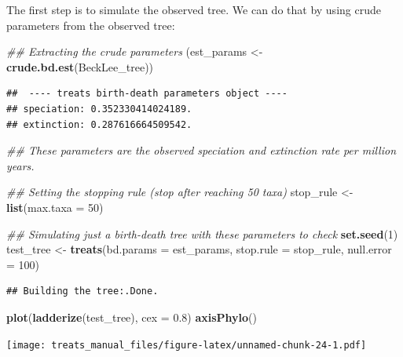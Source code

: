 \documentclass[
]{book}
\newenvironment{Shaded}{\begin{snugshade}}{\end{snugshade}}
\newcommand{\CommentTok}[1]{\textcolor[rgb]{0.56,0.35,0.01}{\textit{#1}}}
\newcommand{\DataTypeTok}[1]{\textcolor[rgb]{0.13,0.29,0.53}{#1}}
\newcommand{\DecValTok}[1]{\textcolor[rgb]{0.00,0.00,0.81}{#1}}
\newcommand{\FloatTok}[1]{\textcolor[rgb]{0.00,0.00,0.81}{#1}}
\newcommand{\KeywordTok}[1]{\textcolor[rgb]{0.13,0.29,0.53}{\textbf{#1}}}
\newcommand{\NormalTok}[1]{#1}
\newcommand{\StringTok}[1]{\textcolor[rgb]{0.31,0.60,0.02}{#1}}
\begin{document}
The first step is to simulate the observed tree.
We can do that by using crude parameters from the observed tree:

\begin{Shaded}
\begin{Highlighting}[]
\CommentTok{\#\# Extracting the crude parameters}
\NormalTok{(est\_params \textless{}{-}}\StringTok{ }\KeywordTok{crude.bd.est}\NormalTok{(BeckLee\_tree))}
\end{Highlighting}
\end{Shaded}

\begin{verbatim}
##  ---- treats birth-death parameters object ---- 
## speciation: 0.352330414024189.
## extinction: 0.287616664509542.
\end{verbatim}

\begin{Shaded}
\begin{Highlighting}[]
\CommentTok{\#\# These parameters are the observed speciation and extinction rate per million years.}

\CommentTok{\#\# Setting the stopping rule (stop after reaching 50 taxa)}
\NormalTok{stop\_rule \textless{}{-}}\StringTok{ }\KeywordTok{list}\NormalTok{(}\DataTypeTok{max.taxa =} \DecValTok{50}\NormalTok{)}

\CommentTok{\#\# Simulating just a birth{-}death tree with these parameters to check}
\KeywordTok{set.seed}\NormalTok{(}\DecValTok{1}\NormalTok{)}
\NormalTok{test\_tree \textless{}{-}}\StringTok{ }\KeywordTok{treats}\NormalTok{(}\DataTypeTok{bd.params  =}\NormalTok{ est\_params,}
                    \DataTypeTok{stop.rule  =}\NormalTok{ stop\_rule,}
                    \DataTypeTok{null.error =} \DecValTok{100}\NormalTok{)}
\end{Highlighting}
\end{Shaded}

\begin{verbatim}
## Building the tree:.Done.
\end{verbatim}

\begin{Shaded}
\begin{Highlighting}[]
\KeywordTok{plot}\NormalTok{(}\KeywordTok{ladderize}\NormalTok{(test\_tree), }\DataTypeTok{cex =} \FloatTok{0.8}\NormalTok{)}
\KeywordTok{axisPhylo}\NormalTok{()}
\end{Highlighting}
\end{Shaded}

\texttt{[image: treats\_manual\_files/figure-latex/unnamed-chunk-24-1.pdf]}
\end{document}
